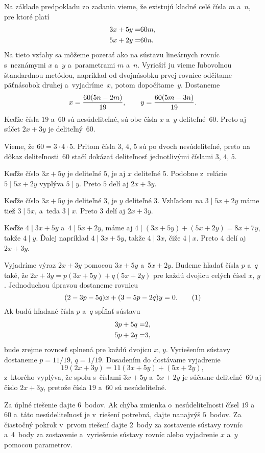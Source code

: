 {%
Na základe predpokladu zo zadania vieme, že existujú kladné celé čísla $m$
a~$n$, pre ktoré platí
$$
\aligned
3x + 5y = & 60m,\\
5x + 2y = & 60n.
\endaligned
$$
Na tieto vzťahy sa môžeme pozerať ako na sústavu lineárnych rovníc
s~neznámymi $x$ a~$y$ a~parametrami $m$ a~$n$. Vyriešiť ju vieme ľubovoľnou
štandardnou metódou, napríklad od dvojnásobku prvej rovnice odčítame
päťnásobok druhej a~vyjadríme~$x$, potom dopočítame~$y$. Dostaneme
$$
x =  {60(5n-2m)\over 19}, \qquad y ={60(5m-3n)\over 19}.
$$
Keďže čísla $19$ a~$60$ sú nesúdeliteľné, sú obe čísla $x$ a~$y$
deliteľné~$60$. Preto aj súčet $2x+3y$ je deliteľný~$60$.

\ineriesenie
Vieme, že $60 = 3\cdot 4\cdot 5$. Pritom čísla $3$, $4$, $5$ sú po dvoch
nesúdeliteľné, preto na dôkaz deliteľnosti~$60$ stačí dokázať deliteľnosť
jednotlivými číslami $3$, $4$, $5$.

Keďže číslo $3x+5y$ je deliteľné $5$, je aj $x$ deliteľné $5$.
Podobne z~relácie $5\mid 5x+2y$ vyplýva $5\mid y$. Preto $5$ delí aj $2x+3y$.

Keďže číslo $3x+5y$ je deliteľné $3$, je $y$ deliteľné $3$.
Vzhľadom na $3\mid 5x+2y$ máme tiež $3\mid 5x$, a~teda $3\mid x$.
Preto $3$ delí aj $2x+3y$.

Keďže $4\mid 3x+5y$ a~$4\mid 5x+2y$, máme aj $4\mid (3x+5y)+(5x+2y) = 8x+7y$,
takže $4\mid y$. Ďalej napríklad $4\mid 3x+5y$, takže $4\mid3x$, čiže $4\mid x$.
Preto $4$ delí aj $2x+3y$.

\ineriesenie
Vyjadríme výraz $2x+3y$ pomocou $3x+5y$ a~$5x+2y$. Budeme hľadať čísla $p$
a~$q$ také, že $2x+3y = p(3x+5y)+q(5x+2y)$ pre každú dvojicu celých čísel
$x$, $y$. Jednoduchou úpravou dostaneme rovnicu
$$
(2-3p-5q)x + (3-5p-2q)y = 0.             \tag1
$$
Ak budú hľadané čísla $p$ a~$q$ spĺňať sústavu
$$
\aligned
3p + 5q = & 2,\\
5p + 2q = & 3,
\endaligned
$$
bude zrejme rovnosť  splnená pre každú dvojicu $x$, $y$. Vyriešením sústavy
dostaneme $p = 11/19$, $q = 1/19$. Dosadením do  dostávame vyjadrenie
$$
            19(2x + 3y) = 11(3x + 5y) + (5x + 2y),
$$
z~ktorého vyplýva, že spolu s~číslami $3x+5y$ a~$5x+2y$ je súčasne
deliteľné~$60$ aj číslo $2x+3y$, pretože čísla $19$ a~$60$ sú nesúdeliteľné.

\nobreak\medskip\petit\noindent
Za úplné riešenie dajte 6~bodov. Ak chýba zmienka o~nesúdeliteľnosti
čísel $19$ a~$60$ a~táto nesúdeliteľnosť je v~riešení potrebná, dajte
nanajvýš $5$~bodov. Za čiastočný pokrok v~prvom riešení dajte 2~body za
zostavenie sústavy rovníc a~4~body za
zostavenie a~vyriešenie sústavy rovníc alebo vyjadrenie $x$ a~$y$ pomocou
parametrov.
\endpetit
}

